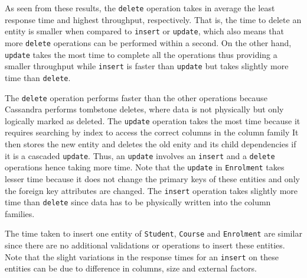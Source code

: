 As seen from these results, the \texttt{delete} operation takes in average the
least response time and  highest throughput, respectively. That is, the time to
delete an entity is smaller when compared to \texttt{insert} or \texttt{update},
which also means that more \texttt{delete} operations can be performed within a
second. On the other hand, \texttt{update} takes the most time to complete all
the operations thus providing a smaller throughput while \texttt{insert} is
faster than \texttt{update} but takes slightly more time than \texttt{delete}.

The \texttt{delete} operation performs faster than the other operations because
Cassandra performs  tombstone deletes, where data is not physically but only
logically marked as deleted. The \texttt{update} operation takes the most time
because it requires searching by index to access the correct columns in the
column family It then stores the new entity and deletes  the old enity and its
child dependencies if it is a cascaded \texttt{update}. Thus,  an
\texttt{update} involves an \texttt{insert} and a \texttt{delete} operations
hence taking more time. Note that the \texttt{update} in \texttt{Enrolment}
takes lesser time because it does not change the primary keys of these entities
and only the foreign key attributes are changed. %
The \texttt{insert} operation takes slightly more time than \texttt{delete}
since data has to be physically written into the column families.

The time taken to insert one entity of \texttt{Student}, \texttt{Course} and
\texttt{Enrolment} are similar since there are no additional validations or
operations to insert these entities. Note that the slight variations in the
response times for an \texttt{insert} on these entities can be due to
difference in columns, size and external factors.



